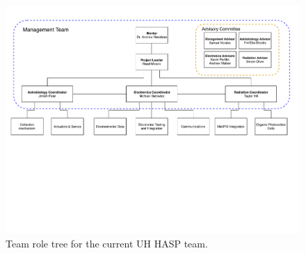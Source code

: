\begin{figure}[!h]
  \begin{center}
    \includegraphics[width=1\textwidth]{./Figures/TeamRoleTree.pdf}
    \caption{Team role tree for the current UH HASP team.}
    \label{fig:Roles} 
  \end{center}
\end{figure}

